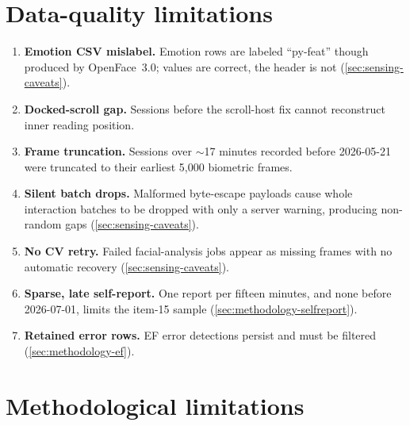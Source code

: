 \section{Data-quality limitations}
\label{sec:limitations-data}

\begin{enumerate}
  \item \textbf{Emotion CSV mislabel.} Emotion rows are labeled
  ``py-feat'' though produced by OpenFace~3.0; values are correct, the
  header is not (\cref{sec:sensing-caveats}).
  \item \textbf{Docked-scroll gap.} Sessions before the scroll-host fix
  cannot reconstruct inner reading position. 
  \item \textbf{Frame truncation.} Sessions over $\sim$17 minutes recorded
  before 2026-05-21 were truncated to their earliest 5{,}000 biometric
  frames. 
  \item \textbf{Silent batch drops.} Malformed byte-escape payloads cause
  whole interaction batches to be dropped with only a server warning,
  producing non-random gaps (\cref{sec:sensing-caveats}).
  \item \textbf{No CV retry.} Failed facial-analysis jobs appear as
  missing frames with no automatic recovery
  (\cref{sec:sensing-caveats}).
  \item \textbf{Sparse, late self-report.} One report per fifteen minutes,
  and none before 2026-07-01, limits the item-15 sample
  (\cref{sec:methodology-selfreport}).
  \item \textbf{Retained error rows.} EF error detections persist and must
  be filtered (\cref{sec:methodology-ef}).
\end{enumerate}

\section{Methodological limitations}
\label{sec:limitations-method}

